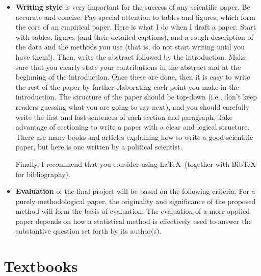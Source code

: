 \documentclass[11pt]{article}
\begin{document}
\begin{itemize}
\item {\bf Writing style} is very important for the success of any
  scientific paper.  Be accurate and concise.  Pay special attention
  to tables and figures, which form the core of an empirical paper.
  Here is what I do when I draft a paper.  Start with tables, figures
  (and their detailed captions), and a rough description of the data
  and the methods you use (that is, do not start writing until you
  have them!).  Then, write the abstract followed by the introduction.
  Make sure that you clearly state your contributions in the abstract
  and at the beginning of the introduction.  Once these are done, then
  it is easy to write the rest of the paper by further elaborating
  each point you make in the introduction.  The structure of the paper
  should be top-down (i.e., don't keep readers guessing what you are
  going to say next), and you should carefully write the first and
  last sentences of each section and paragraph. Take advantage of sectioning to write a paper with a
  clear and logical structure. There are many 
  books and articles explaining how to write a good scientific paper,
  but here is one written by a political scientist.
  \begin{bibunit}[unsrtnat]
    \nocite{king:06}
    \putbib[my]
  \end{bibunit}

  Finally, I recommend that you consider using \LaTeX\ (together with BibTeX for bibliography).  


\item {\bf Evaluation} of the final project will be based on the
  following criteria.  For a purely methodological paper, the
  originality and significance of the proposed method will form the
  basis of evaluation.  The evaluation of a more applied paper depends
  on how a statistical method is effectively used to answer the
  substantive question set forth by its author(s).
\end{itemize}

\section{Textbooks}
\end{document}
